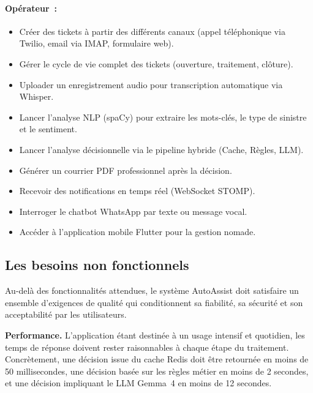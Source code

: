 \paragraph{Op\'{e}rateur~:}

\begin{itemize}[label=---]
    \item Cr\'{e}er des tickets \`{a} partir des diff\'{e}rents canaux (appel t\'{e}l\'{e}phonique via Twilio, email via IMAP, formulaire web).
    \item G\'{e}rer le cycle de vie complet des tickets (ouverture, traitement, cl\^{o}ture).
    \item Uploader un enregistrement audio pour transcription automatique via Whisper.
    \item Lancer l'analyse NLP (spaCy) pour extraire les mots-cl\'{e}s, le type de sinistre et le sentiment.
    \item Lancer l'analyse d\'{e}cisionnelle via le pipeline hybride (Cache, R\`{e}gles, LLM).
    \item G\'{e}n\'{e}rer un courrier PDF professionnel apr\`{e}s la d\'{e}cision.
    \item Recevoir des notifications en temps r\'{e}el (WebSocket STOMP).
    \item Interroger le chatbot WhatsApp par texte ou message vocal.
    \item Acc\'{e}der \`{a} l'application mobile Flutter pour la gestion nomade.
\end{itemize}

\subsection{Les besoins non fonctionnels}

Au-del\`{a} des fonctionnalit\'{e}s attendues, le syst\`{e}me AutoAssist doit satisfaire un ensemble d'exigences de qualit\'{e} qui conditionnent sa fiabilit\'{e}, sa s\'{e}curit\'{e} et son acceptabilit\'{e} par les utilisateurs.

\indent \textbf{Performance.} L'application \'{e}tant destin\'{e}e \`{a} un usage intensif et quotidien, les temps de r\'{e}ponse doivent rester raisonnables \`{a} chaque \'{e}tape du traitement. Concr\`{e}tement, une d\'{e}cision issue du cache Redis doit \^{e}tre retourn\'{e}e en moins de 50 millisecondes, une d\'{e}cision bas\'{e}e sur les r\`{e}gles m\'{e}tier en moins de 2 secondes, et une d\'{e}cision impliquant le LLM Gemma~4 en moins de 12 secondes.

